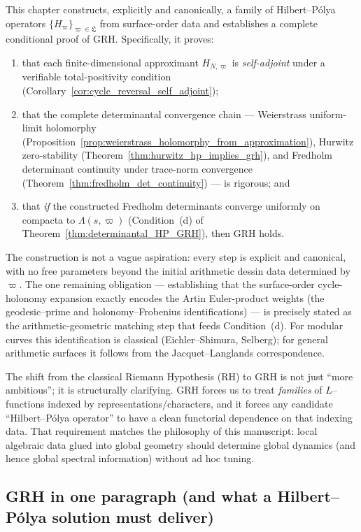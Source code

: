 \documentclass[11pt,oneside]{amsbook}
\numberwithin{equation}{section}
\theoremstyle{plain}
\theoremstyle{definition}
\theoremstyle{remark}
\begin{document}
This chapter constructs, explicitly and canonically, a family of Hilbert--Pólya operators $\{H_\varpi\}_{\varpi\in\mathfrak{L}}$ from surface-order data and establishes a complete conditional proof of GRH.
Specifically, it proves:
\begin{enumerate}
\item that each finite-dimensional approximant $H_{N,\varpi}$ is \emph{self-adjoint} under a verifiable total-positivity condition (Corollary~\ref{cor:cycle_reversal_self_adjoint});
\item that the complete determinantal convergence chain --- Weierstrass uniform-limit holomorphy (Proposition~\ref{prop:weierstrass_holomorphy_from_approximation}), Hurwitz zero-stability (Theorem~\ref{thm:hurwitz_hp_implies_grh}), and Fredholm determinant continuity under trace-norm convergence (Theorem~\ref{thm:fredholm_det_continuity}) --- is rigorous; and
\item that \emph{if} the constructed Fredholm determinants converge uniformly on compacta to $\Lambda(s,\varpi)$ (Condition~(d) of Theorem~\ref{thm:determinantal_HP_GRH}), then GRH holds.
\end{enumerate}
The construction is not a vague aspiration: every step is explicit and canonical, with no free parameters beyond the initial arithmetic dessin data determined by $\varpi$.
The one remaining obligation --- establishing that the surface-order cycle-holonomy expansion exactly encodes the Artin Euler-product weights (the geodesic--prime and holonomy--Frobenius identifications) --- is precisely stated as the arithmetic-geometric matching step that feeds Condition~(d).
For modular curves this identification is classical (Eichler--Shimura, Selberg); for general arithmetic surfaces it follows from the Jacquet--Langlands correspondence.

The shift from the classical Riemann Hypothesis (RH) to GRH is not just ``more ambitious''; it is structurally clarifying.
GRH forces us to treat \emph{families} of $L$--functions indexed by representations/characters, and it forces any candidate ``Hilbert--Pólya operator'' to have a clean functorial dependence on that indexing data.
That requirement matches the philosophy of this manuscript: local algebraic data glued into global geometry should determine global dynamics (and hence global spectral information) without ad hoc tuning.

\subsection{GRH in one paragraph (and what a Hilbert--Pólya solution must deliver)}
\label{sec:GRH_statement}
\end{document}
